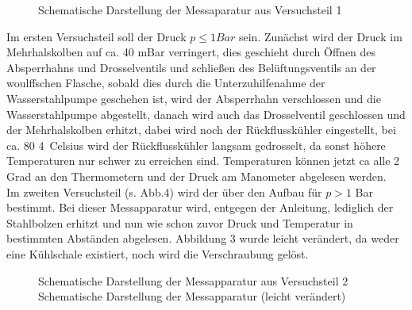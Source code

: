 \begin{wrapfigure}[16]{r}{0.4\textwidth}
        \caption{Schematische Darstellung der Messaparatur aus Versuchsteil 1}
        \label{fig:Abb3}
\end{wrapfigure}
Im ersten Versuchsteil soll der Druck $p \leq 1 Bar$ sein.
Zunächst wird der Druck im Mehrhalskolben auf ca. 40 mBar verringert, 
dies geschieht durch Öffnen des Absperrhahns und Drosselventils und schließen des Belüftungsventils 
an der woulffschen Flasche, sobald dies durch die Unterzuhilfenahme der Wasserstahlpumpe geschehen ist, 
wird der Absperrhahn verschlossen und die Wasserstahlpumpe abgestellt, danach wird auch das Drosselventil geschlossen 
und der Mehrhalskolben erhitzt, dabei wird noch der Rückflusskühler eingestellt, bei ca. 80 \SI{4}{Celsius} wird
der Rückflusskühler langsam gedrosselt, da sonst höhere Temperaturen nur schwer zu erreichen sind.
Temperaturen können jetzt ca alle 2 Grad an den Thermometern und der Druck am Manometer abgelesen werden. \\


Im zweiten Versuchsteil (s. Abb.4) wird der über den Aufbau für 
$p > 1$ Bar bestimmt.
Bei dieser Messapparatur wird, entgegen der Anleitung, lediglich der Stahlbolzen erhitzt und nun wie schon zuvor Druck und Temperatur in bestimmten Abständen abgelesen.
Abbildung 3 wurde leicht verändert, da weder eine Kühlschale existiert, noch wird die Verschraubung gelöst. 
\begin{wrapfigure}[16]{r}{0.7\textwidth}
        \caption{Schematische Darstellung der Messapparatur aus Versuchsteil 2 Schematische Darstellung der Messapparatur (leicht verändert)}
        \label{fig:Abb4}
\end{wrapfigure}
